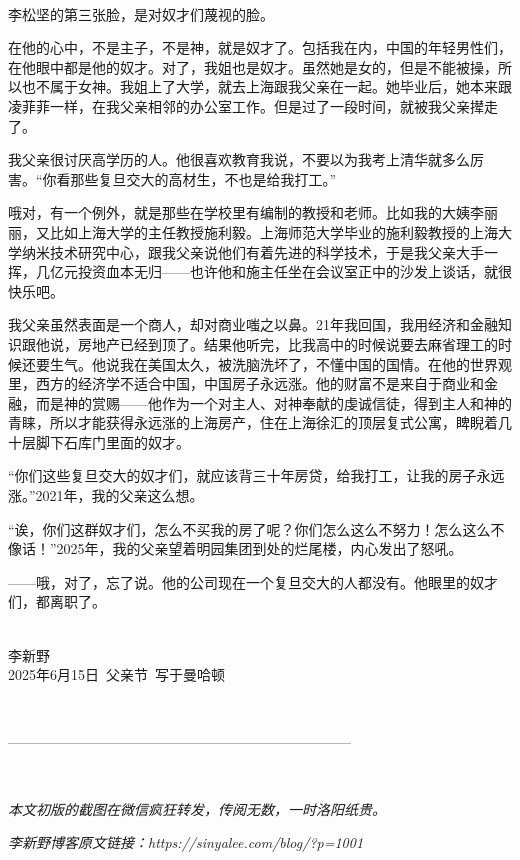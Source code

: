 \ 

李松坚的第三张脸，是对奴才们蔑视的脸。

在他的心中，不是主子，不是神，就是奴才了。包括我在内，中国的年轻男性们，在他眼中都是他的奴才。对了，我姐也是奴才。虽然她是女的，但是不能被操，所以也不属于女神。我姐上了大学，就去上海跟我父亲在一起。她毕业后，她本来跟凌菲菲一样，在我父亲相邻的办公室工作。但是过了一段时间，就被我父亲撵走了。

我父亲很讨厌高学历的人。他很喜欢教育我说，不要以为我考上清华就多么厉害。``你看那些复旦交大的高材生，不也是给我打工。''

哦对，有一个例外，就是那些在学校里有编制的教授和老师。比如我的大姨李丽丽，又比如上海大学的主任教授施利毅。上海师范大学毕业的施利毅教授的上海大学纳米技术研究中心，跟我父亲说他们有着先进的科学技术，于是我父亲大手一挥，几亿元投资血本无归——也许他和施主任坐在会议室正中的沙发上谈话，就很快乐吧。

我父亲虽然表面是一个商人，却对商业嗤之以鼻。21年我回国，我用经济和金融知识跟他说，房地产已经到顶了。结果他听完，比我高中的时候说要去麻省理工的时候还要生气。他说我在美国太久，被洗脑洗坏了，不懂中国的国情。在他的世界观里，西方的经济学不适合中国，中国房子永远涨。他的财富不是来自于商业和金融，而是神的赏赐——他作为一个对主人、对神奉献的虔诚信徒，得到主人和神的青睐，所以才能获得永远涨的上海房产，住在上海徐汇的顶层复式公寓，睥睨着几十层脚下石库门里面的奴才。

``你们这些复旦交大的奴才们，就应该背三十年房贷，给我打工，让我的房子永远涨。''2021年，我的父亲这么想。

``诶，你们这群奴才们，怎么不买我的房了呢？你们怎么这么不努力！怎么这么不像话！''2025年，我的父亲望着明园集团到处的烂尾楼，内心发出了怒吼。

——哦，对了，忘了说。他的公司现在一个复旦交大的人都没有。他眼里的奴才们，都离职了。

\ \\李新野\\
2025年6月15日\ 父亲节\ 写于曼哈顿


\ 

--------------------------------------------------------------------------

\ 

\textit{本文初版的截图在微信疯狂转发，传阅无数，一时洛阳纸贵。}

\textit{李新野博客原文链接：https://sinyalee.com/blog/?p=1001}
